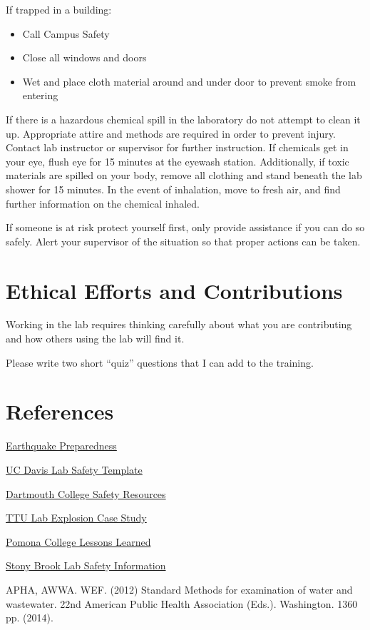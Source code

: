 \documentclass[12pt]{../../cls/SOP4_alpha}\usepackage[]{graphicx}\usepackage[]{xcolor}
\begin{document}
\NP If trapped in a building:
\begin{itemize}
  \item Call Campus Safety
  \item Close all windows and doors
  \item Wet and place cloth material around and under door to prevent smoke from entering
\end{itemize}

\NP If there is a hazardous chemical spill in the laboratory do not attempt to clean it up.  Appropriate attire and methods are required in order to prevent injury.  Contact lab instructor or supervisor for further instruction. If chemicals get in your eye, flush eye for 15 minutes at the eyewash station.  Additionally, if toxic materials are spilled on your body, remove all clothing and stand beneath the lab shower for 15 minutes. In the event of inhalation, move to fresh air, and find further information on the chemical inhaled.  

\NP If someone is at risk protect yourself first, only provide assistance if you can do so safely.  Alert your supervisor of the situation so that proper actions can be taken.

\section{Ethical Efforts and Contributions}

\NP Working in the lab requires thinking carefully about what you are contributing and how others using the lab will find it. 

\NP Please write two short ``quiz'' questions that I can add to the training. 

\section{References}

\NP \href{http://emergency.cdc.gov/disasters/earthquakes/prepared.asp}{Earthquake Preparedness}

\NP \href{http://safetyservices.ucdavis.edu/sites/default/files/documents/LabSafetyPlan_Template.docx}{UC Davis Lab Safety Template}

\NP \href{https://www.dartmouth.edu/~chemlab/info/safety/hazards.html}{Dartmouth College Safety Resources}

\NP \href{http://www.csb.gov/file.aspx?DocumentId=420}{TTU Lab Explosion Case Study}

\NP \href{https://sakai.claremont.edu/access/content/group/CX_mtg_87013/Project%201%3A%20Lab%20and%20Field%20Safety/Lessons%20Learned/Lesson_Learned_Report.pdf}{Pomona College Lessons Learned}

\NP \href{https://ehs.stonybrook.edu/programs/laboratory-safety}{Stony Brook Lab Safety Information}

\NP APHA, AWWA. WEF. (2012) Standard Methods for examination of water and wastewater. 22nd American Public Health Association (Eds.). Washington. 1360 pp. (2014).
\end{document}
